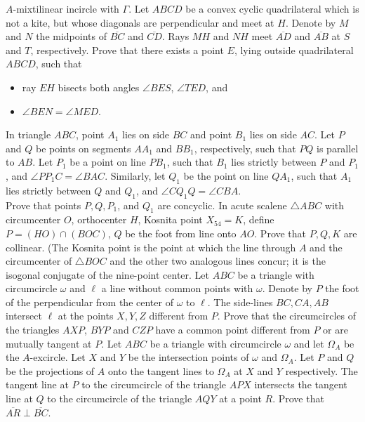 \documentclass{seto}
\begin{document}
$A$-mixtilinear incircle with $\Gamma$.
 Let $ABCD$ be a convex cyclic quadrilateral which is not a kite, but whose diagonals are perpendicular and meet at $H$. Denote by $M$ and $N$ the midpoints of $\overline{BC}$ and $\overline{CD}$. Rays $MH$ and $NH$ meet $\overline{AD}$ and $\overline{AB}$ at $S$ and $T$, respectively. Prove that there exists a point $E$, lying outside quadrilateral $ABCD$, such that
\begin{itemize}
  \item ray $EH$ bisects both angles $\angle BES$, $\angle TED$, and
  \item $\angle BEN = \angle MED$.
\end{itemize}
\exercise[IMO 2019/2] In triangle $ABC$, point $A_1$ lies on side $BC$ and point $B_1$ lies on side $AC$. Let $P$ and $Q$ be points on segments $AA_1$ and $BB_1$, respectively, such that $PQ$ is parallel to $AB$. Let $P_1$ be a point on line $PB_1$, such that $B_1$ lies strictly between $P$ and $P_1$, and $\angle PP_1C=\angle BAC$. Similarly, let $Q_1$ be the point on line $QA_1$, such that $A_1$ lies strictly between $Q$ and $Q_1$, and $\angle CQ_1Q=\angle CBA$. \\[4pt]
Prove that points $P,Q,P_1$, and $Q_1$ are concyclic. 
\exercise[MOP HW \#21] In acute scalene $\triangle ABC$ with circumcenter $O$, orthocenter $H$, Kosnita point $X_{54}=K$, define $P=(HO)\cap(BOC)$, $Q$ be the foot from line onto $AO$. Prove that $P,Q,K$ are collinear. (The Kosnita point is the point at which the line through $A$ and the circumcenter of $\triangle BOC$ and the other two analogous lines concur; it is the isogonal conjugate of the nine-point center. 
\exercise[Shortlist 2012/G8]Let $ABC$ be a triangle with circumcircle $\omega$ and $\ell$ a line without common points with $\omega$. Denote by $P$ the foot of the perpendicular from the center of $\omega$ to $\ell$. The side-lines $BC,CA,AB$ intersect $\ell$ at the points $X,Y,Z$ different from $P$. Prove that the circumcircles of the triangles $AXP$, $BYP$ and $CZP$ have a common point different from $P$ or are mutually tangent at $P$.
\exercise[Shortlist 2021/G8]Let $ABC$ be a triangle with circumcircle $\omega$ and let $\Omega_A$ be the $A$-excircle. Let $X$ and $Y$ be the intersection points of $\omega$ and $\Omega_A$. Let $P$ and $Q$ be the projections of $A$ onto the tangent lines to $\Omega_A$ at $X$ and $Y$ respectively. The tangent line at $P$ to the circumcircle of the triangle $APX$ intersects the tangent line at $Q$ to the circumcircle of the triangle $AQY$ at a point $R$. Prove that $\overline{AR} \perp \overline{BC}$.\\
\end{document}
